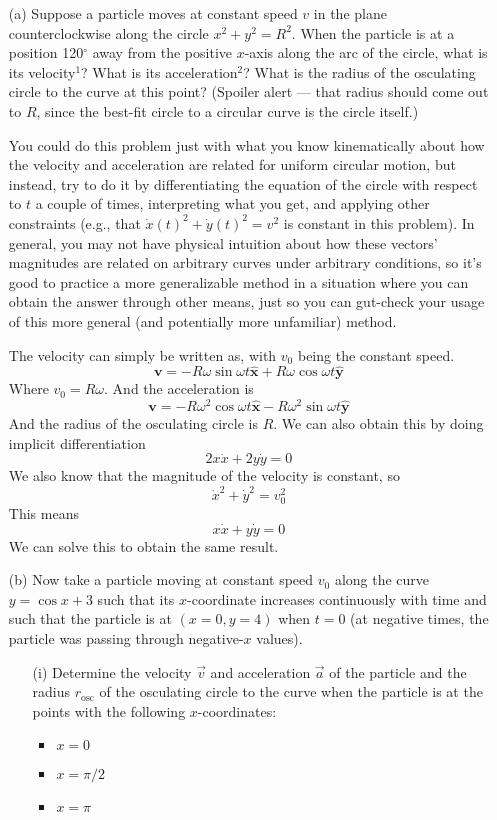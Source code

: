 \documentclass[12pt]{article}
\newcommand{\unx}{\hat{\mathbf{x}}}
\newcommand{\uny}{\hat{\mathbf{y}}}
\begin{document}
\begin{enumerate}
    \item[(a)] Suppose a particle moves at constant speed \( v \) in the plane counterclockwise along the circle \( x^2 + y^2 = R^2 \). When the particle is at a position 120\(^\circ\) away from the positive \(x\)-axis along the arc of the circle, what is its velocity\(^1\)? What is its acceleration\(^2\)? What is the radius of the osculating circle to the curve at this point? (Spoiler alert — that radius should come out to \( R \), since the best-fit circle to a circular curve is the circle itself.)

    You could do this problem just with what you know kinematically about how the velocity and acceleration are related for uniform circular motion, but instead, try to do it by differentiating the equation of the circle with respect to \( t \) a couple of times, interpreting what you get, and applying other constraints (e.g., that \( \dot{x}(t)^2 + \dot{y}(t)^2 = v^2 \) is constant in this problem). In general, you may not have physical intuition about how these vectors’ magnitudes are related on arbitrary curves under arbitrary conditions, so it’s good to practice a more generalizable method in a situation where you can obtain the answer through other means, just so you can gut-check your usage of this more general (and potentially more unfamiliar) method.

    The velocity can simply be written as, with $v_0$ being the constant speed.
    \[
    \mathbf{v} = -R\omega\sin\omega t \unx + R\omega\cos\omega t\uny
    \]
    Where $v_0 = R\omega$. And the acceleration is
    \[
    \mathbf{v} = -R\omega^2\cos\omega t \unx - R\omega^2\sin\omega t\uny
    \]
    And the radius of the osculating circle is $R$. We can also obtain this by doing implicit differentiation
    \[
    2x\dot{x} + 2y\dot{y} = 0
    \]
    We also know that the magnitude of the velocity is constant, so
    \[
    \dot{x}^2+\dot{y}^2 = v_0^2
    \]
    This means
    \[
    x\dot{x}+y\dot{y} = 0
    \]
    We can solve this to obtain the same result.

    \item[(b)] Now take a particle moving at constant speed \( v_0 \) along the curve \( y = \cos x + 3 \) such that its \(x\)-coordinate increases continuously with time and such that the particle is at \( (x = 0, y = 4) \) when \( t = 0 \) (at negative times, the particle was passing through negative-\(x\) values).

    \begin{enumerate}
        \item[(i)] Determine the velocity \( \vec{v} \) and acceleration \( \vec{a} \) of the particle and the radius \( r_{\text{osc}} \) of the osculating circle to the curve when the particle is at the points with the following \(x\)-coordinates:
        \begin{itemize}
            \item \( x = 0 \)
            \item \( x = \pi/2 \)
            \item \( x = \pi \)
        \end{itemize}


\end{enumerate}
\end{enumerate}
\end{document}
